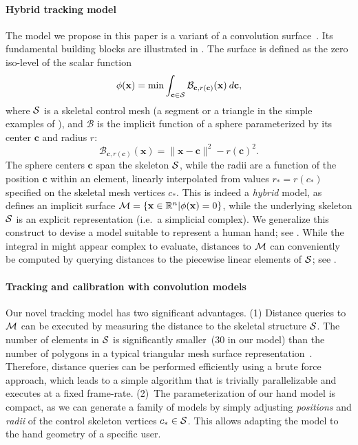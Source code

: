 \paragraph{Hybrid tracking model}
The model we propose in this paper is a variant of a convolution surface~\cite{bloomenthal1991convolution}. Its fundamental building blocks are illustrated in . The surface is defined as the zero iso-level of the scalar function
\begin{equation}
\phi(\mathbf{x}) = \min \int_{\mathbf{c} \in \mathcal{S}} \mathcal{B}_{\mathbf{c}, r(\mathbf{c})}(\mathbf{x}) \: d\mathbf{c},
\label{eq:convsurf}
\end{equation}
where $\mathcal{S}$ is a skeletal control mesh (a segment or a triangle in the simple examples of ), and $\mathcal{B}$ is the implicit function of a sphere parameterized by its center $\mathbf{c}$ and radius $r$:
\begin{equation}
\mathcal{B}_{\mathbf{c}, r(\mathbf{c})}(\mathbf{x}) = \|\mathbf{x}-\mathbf{c}\|^2 - r(\mathbf{c})^2.
\end{equation}
The sphere centers $\mathbf{c}$ span the skeleton $\mathcal{S}$, while the radii are a function of the position $\mathbf{c}$ within an element, linearly interpolated from values $r_*=r(c_*)$ specified on the skeletal mesh vertices $c_*$. This is indeed a \emph{hybrid} model, as  defines an implicit surface $\mathcal{M} = \{\mathbf{x} \in \mathbb{R}^n | \phi(\mathbf{x})=0 \}$, while the underlying skeleton $\mathcal{S}$ is an explicit representation (i.e.\ a simplicial complex). We generalize this construct to devise a model suitable to represent a human hand; see .
While the integral in  might appear complex to evaluate, distances to $\mathcal{M}$ can conveniently be computed by querying distances to the piecewise linear elements of $\mathcal{S}$; see .


\paragraph{Tracking and calibration with convolution models}
Our novel tracking model has two significant advantages. (1) Distance queries to $\mathcal{M}$ can be executed by measuring the distance to the skeletal structure $\mathcal{S}$. The number of elements in $\mathcal{S}$ is significantly smaller~(30 in our model) than the number of polygons in a typical triangular mesh surface representation~\cite{thiery2013sphere}. 
Therefore, distance queries can be performed efficiently using a brute force approach, which leads to a simple algorithm that is trivially parallelizable and executes at a fixed frame-rate. (2)~The parameterization of our hand model is compact, as we can generate a family of models by simply adjusting \emph{positions} and \emph{radii} of the control skeleton vertices $c_* \in \mathcal{S}$. This allows adapting the model to the hand geometry of a specific user.

